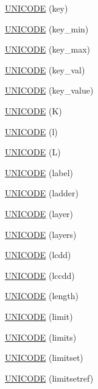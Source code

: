 \begin{DoxyCompactItemize}
\hyperlink{namespace_d_d4hep_1_1_x_m_l_a304f826d7986aa2c7d716adeeed1d301}{UNICODE} (key)
\item 
\hyperlink{namespace_d_d4hep_1_1_x_m_l_acba7a7a0c644ec6952e6c563d8b08a9e}{UNICODE} (key\_\-min)
\item 
\hyperlink{namespace_d_d4hep_1_1_x_m_l_aa975760f54641fb9c4ec5783659f568c}{UNICODE} (key\_\-max)
\item 
\hyperlink{namespace_d_d4hep_1_1_x_m_l_a75939c2c758720cdd66f7ffb88c9e964}{UNICODE} (key\_\-val)
\item 
\hyperlink{namespace_d_d4hep_1_1_x_m_l_a2ce43d87a10ebbff062e4465f110e17d}{UNICODE} (key\_\-value)
\item 
\hyperlink{namespace_d_d4hep_1_1_x_m_l_a045c70ead754b0cc61881ad0dddd071c}{UNICODE} (K)
\item 
\hyperlink{namespace_d_d4hep_1_1_x_m_l_ad1a73fe9d363f73e07b502ec2efe04e9}{UNICODE} (l)
\item 
\hyperlink{namespace_d_d4hep_1_1_x_m_l_aebd5986b62f4201f4f94143f57ebcf38}{UNICODE} (L)
\item 
\hyperlink{namespace_d_d4hep_1_1_x_m_l_a8b60a6f01d8155d38b8a1e5dea6899ca}{UNICODE} (label)
\item 
\hyperlink{namespace_d_d4hep_1_1_x_m_l_a780737736a46409cc21d50c5c11c219d}{UNICODE} (ladder)
\item 
\hyperlink{namespace_d_d4hep_1_1_x_m_l_a56c96e0ff661753570981fe07b3a4c88}{UNICODE} (layer)
\item 
\hyperlink{namespace_d_d4hep_1_1_x_m_l_aa0496d4114e8a8f4c50ccf0f7c812b52}{UNICODE} (layers)
\item 
\hyperlink{namespace_d_d4hep_1_1_x_m_l_a328e84fa3cc37e9dda09dea109e5692c}{UNICODE} (lcdd)
\item 
\hyperlink{namespace_d_d4hep_1_1_x_m_l_a3f5fb99aac45758cd31845bee59ae087}{UNICODE} (lccdd)
\item 
\hyperlink{namespace_d_d4hep_1_1_x_m_l_a09edfa735264b49205a628afadf0af82}{UNICODE} (length)
\item 
\hyperlink{namespace_d_d4hep_1_1_x_m_l_a72de6a6830106f8a0ab83bdb46be68a3}{UNICODE} (limit)
\item 
\hyperlink{namespace_d_d4hep_1_1_x_m_l_a742a3cc0c88de0fa62885e5d932211c5}{UNICODE} (limits)
\item 
\hyperlink{namespace_d_d4hep_1_1_x_m_l_ad91efab2e5432fea9347d7e54e716d4b}{UNICODE} (limitset)
\item 
\hyperlink{namespace_d_d4hep_1_1_x_m_l_a906973f56218ef383186c13e77faaa13}{UNICODE} (limitsetref)
\item 

\end{DoxyCompactItemize}
